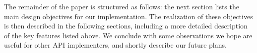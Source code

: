   The remainder of the paper is structured as follows: the next
  section lists the main design objectives for our implementation.
  The realization of these objectives is then described in the
  following sections, including a more detailed description of the key
  features listed above.  We conclude with some observations we hope
  are useful for other API implementers, and shortly describe our
  future plans.
 


